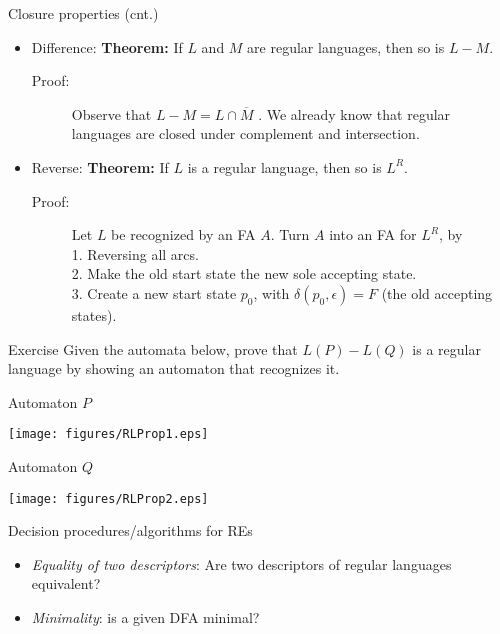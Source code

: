 \documentclass{prosper}%
\newcommand{\e} {{\mbox{$\epsilon$}}}
\begin{document}
\begin{slide}{Closure properties (cnt.)}
\begin{itemize}
\item {\blue Difference}: {\bf Theorem:} If $L$ and $M$ are regular languages, then so is $L - M$.
\begin{description}
\item[Proof:] Observe that $L-M = L \cap \overline{M}$ . We 
already know that regular languages are closed 
under complement and intersection. 
\end{description}
\item {\blue Reverse}: {\bf Theorem:} If $L$ is a regular language, then so is $L^R$. 
\begin{description}\item[Proof:] Let $L$ be recognized by an FA $A$.  Turn $A$ into an FA for $L^R$, by\\ 
1. Reversing all arcs.\\ 
2. Make the old start state the new sole accepting state. \\
3. Create a new start state $p_0$, with $\delta(p_0,\e) = F$ (the old accepting states). 
\end{description}
\end{itemize}
\end{slide}

\begin{slide}{Exercise}
Given the automata below, prove that $L(P)-L(Q)$ is a regular language by showing an automaton that recognizes it.

\begin{minipage}{5cm}
\begin{center}
Automaton $P$

\vspace{1cm}
 \texttt{[image: figures/RLProp1.eps]}
\end{center}
\end{minipage}
\begin{minipage}{5cm}
\begin{center}
Automaton $Q$

\vspace{1cm}
 \texttt{[image: figures/RLProp2.eps]}
\end{center}
\end{minipage}


\end{slide}

\begin{slide}{Decision procedures/algorithms for REs}
\begin{itemize}
\item {\em Equality of two descriptors}:  Are two descriptors of regular languages equivalent?
\item {\em Minimality}: is a given DFA minimal?
\end{itemize}
\end{slide}
\end{document}
